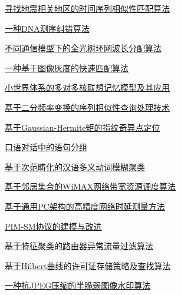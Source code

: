 \documentclass[a4paper]{article}
\begin{document}
\href{http://www.jos.org.cn/ch/reader/download_pdf.aspx?file_no=20060202&year_id=2006&quarter_id=2&falg=1}{寻找地震相关地区的时间序列相似性匹配算法}

\href{http://www.jos.org.cn/ch/reader/download_pdf.aspx?file_no=20060203&year_id=2006&quarter_id=2&falg=1}{一种DNA测序纠错算法}

\href{http://www.jos.org.cn/ch/reader/download_pdf.aspx?file_no=20060204&year_id=2006&quarter_id=2&falg=1}{不同通信模型下的全光树环网波长分配算法}

\href{http://www.jos.org.cn/ch/reader/download_pdf.aspx?file_no=20060206&year_id=2006&quarter_id=2&falg=1}{一种基于图像灰度的快速匹配算法}

\href{http://www.jos.org.cn/ch/reader/download_pdf.aspx?file_no=20060207&year_id=2006&quarter_id=2&falg=1}{小世界体系的多对多核联想记忆模型及其应用}

\href{http://www.jos.org.cn/ch/reader/download_pdf.aspx?file_no=20060208&year_id=2006&quarter_id=2&falg=1}{基于二分频率变换的序列相似性查询处理技术}

\href{http://www.jos.org.cn/ch/reader/download_pdf.aspx?file_no=20060209&year_id=2006&quarter_id=2&falg=1}{基于Gaussian-Hermite矩的指纹奇异点定位}

\href{http://www.jos.org.cn/ch/reader/download_pdf.aspx?file_no=20060210&year_id=2006&quarter_id=2&falg=1}{口语对话中的语句分组}

\href{http://www.jos.org.cn/ch/reader/download_pdf.aspx?file_no=20060211&year_id=2006&quarter_id=2&falg=1}{基于次范畴化的汉语多义动词模糊聚类}

\href{http://www.jos.org.cn/ch/reader/download_pdf.aspx?file_no=20060212&year_id=2006&quarter_id=2&falg=1}{基于邻居集合的WiMAX网络带宽资源调度算法}

\href{http://www.jos.org.cn/ch/reader/download_pdf.aspx?file_no=20060213&year_id=2006&quarter_id=2&falg=1}{基于通用PC架构的高精度网络时延测量方法}

\href{http://www.jos.org.cn/ch/reader/download_pdf.aspx?file_no=20060214&year_id=2006&quarter_id=2&falg=1}{PIM-SM协议的建模与改进}

\href{http://www.jos.org.cn/ch/reader/download_pdf.aspx?file_no=20060215&year_id=2006&quarter_id=2&falg=1}{基于特征聚类的路由器异常流量过滤算法}

\href{http://www.jos.org.cn/ch/reader/download_pdf.aspx?file_no=20060216&year_id=2006&quarter_id=2&falg=1}{基于Hilbert曲线的许可证存储策略及查找算法}

\href{http://www.jos.org.cn/ch/reader/download_pdf.aspx?file_no=20060217&year_id=2006&quarter_id=2&falg=1}{一种抗JPEG压缩的半脆弱图像水印算法}
\end{document}
